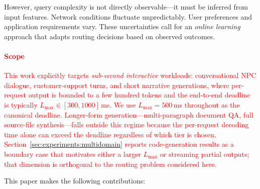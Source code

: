 \documentclass[final,3p,twocolumn,authoryear]{elsarticle}
\newcommand{\rev}[1]{\textcolor{red}{#1}}
\theoremstyle{plain}
\theoremstyle{definition}
\begin{document}
However, query complexity is not directly observable---it must be inferred from input features.
Network conditions fluctuate unpredictably.
User preferences and application requirements vary.
These uncertainties call for an \emph{online learning} approach that adapts routing decisions based on observed outcomes.

\rev{\paragraph{Scope}\label{sec:intro-scope-note}
This work explicitly targets \emph{sub-second interactive} workloads: conversational NPC dialogue, customer-support turns, and short narrative generations, where per-request output is bounded to a few hundred tokens and the end-to-end deadline is typically $L_{\max}\in[300, 1000]$\,ms. We use $L_{\max}=500$\,ms throughout as the canonical deadline. Longer-form generation---multi-paragraph document QA, full source-file synthesis---falls outside this regime because the per-request decoding time alone can exceed the deadline regardless of which tier is chosen. Section~\ref{sec:experiments:multidomain} reports code-generation results as a boundary case that motivates either a larger $L_{\max}$ or streaming partial outputs; that dimension is orthogonal to the routing problem considered here.}

This paper makes the following contributions:
\end{document}
